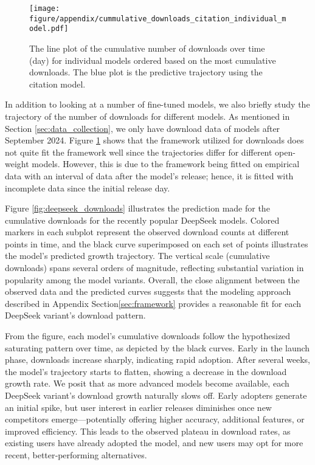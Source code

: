 \documentclass{article} %
\begin{document}
	 \begin{figure}[ht]
        		\begin{center}
          	 \texttt{[image: figure/appendix/cummulative\_downloads\_citation\_individual\_model.pdf]}
        \end{center}
        \caption{The line plot of the cumulative number of downloads over time (day) for individual models ordered based on the most cumulative downloads. The blue plot is the predictive trajectory using the citation model.}
        \label{fig:cumulative_download_individual}
   	 \end{figure}
	
    In addition to looking at a number of fine-tuned models, we also briefly study the trajectory of the number of downloads for different models. As mentioned in Section \ref{sec:data_collection}, we only have download data of models after September 2024. Figure \ref{fig:cumulative_download_individual} shows that the framework utilized for downloads does not quite fit the framework well since the trajectories differ for different open-weight models. However, this is due to the framework being fitted on empirical data with an interval of data after the model's release; hence, it is fitted with incomplete data since the initial release day. 
        
    Figure \ref{fig:deepseek_downloads} illustrates the prediction made for the cumulative downloads for the recently popular DeepSeek models. Colored markers in each subplot represent the observed download counts at different points in time, and the black curve superimposed on each set of points illustrates the model’s predicted growth trajectory. The vertical scale (cumulative downloads) spans several orders of magnitude, reflecting substantial variation in popularity among the model variants. Overall, the close alignment between the observed data and the predicted curves suggests that the modeling approach described in Appendix Section\ref{sec:framework} provides a reasonable fit for each DeepSeek variant’s download pattern. 

    From the figure, each model’s cumulative downloads follow the hypothesized saturating pattern over time, as depicted by the black curves. Early in the launch phase, downloads increase sharply, indicating rapid adoption. After several weeks, the model’s trajectory starts to flatten, showing a decrease in the download growth rate. We posit that as more advanced models become available, each DeepSeek variant’s download growth naturally slows off. Early adopters generate an initial spike, but user interest in earlier releases diminishes once new competitors emerge—potentially offering higher accuracy, additional features, or improved efficiency. This leads to the observed plateau in download rates, as existing users have already adopted the model, and new users may opt for more recent, better‐performing alternatives. 
    
\end{document}
